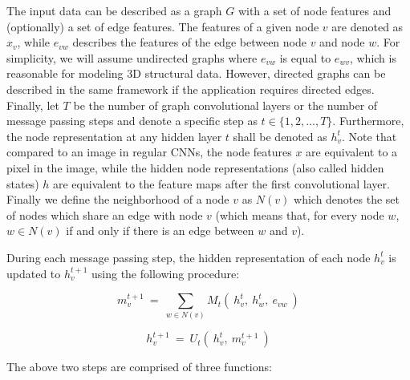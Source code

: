 The input data can be described as a graph $G$ with	a set of node features and (optionally) a set of edge features. The features of a given node $v$ are denoted as $x_v$, while $e_{vw}$ describes the features of the edge between node $v$ and node $w$. For simplicity, we will assume undirected graphs where $e_{vw}$ is equal to $e_{wv}$, which is reasonable for modeling 3D structural data. However, directed graphs can be described in the same framework if the application requires directed edges. Finally, let $T$ be the number of graph convolutional layers or the number of message passing steps and denote a specific step as $t \in \{1, 2, ..., T\}$. Furthermore, the node representation at any hidden layer $t$ shall be denoted as $h_v^t$. Note that compared to an image in regular CNNs, the node features $x$ are equivalent to a pixel in the image, while the hidden node representations (also called hidden states) $h$ are equivalent to the feature maps after the first convolutional layer. Finally we define the neighborhood of a node $v$ as $N(v)$ which denotes the set of nodes which share an edge with node $v$ (which means that, for every node $w$, $w \in N(v)$ if and only if there is an edge between $w$ and $v$).

During each message passing step, the hidden representation of each node $h_v^t$ is updated to $h_v^{t+1}$ using the following procedure:

\begin{equation}\label{eq:message-function}
m_v^{t+1} ~=~ \sum_{w \in N(v)} M_t(~h_v^t,~ h_w^t,~ e_{vw}~)
\end{equation}

\begin{equation}\label{eq:update-function}
h_v^{t+1} ~=~ U_t(~h_v^t, ~m_v^{t+1}~)
\end{equation}


The above two steps are comprised of three functions:


